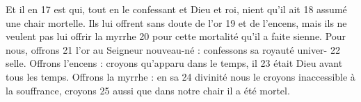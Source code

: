 Et il en	 
17	 	est qui, tout en le confessant et Dieu et roi, nient qu'il ait	 
18	 	assumé une chair mortelle. Ils lui offrent sans doute de l'or	 
19	 	et de l'encens, mais ils ne veulent pas lui offrir la myrrhe	 
20	 	pour cette mortalité qu'il a faite sienne. Pour nous, offrons	 
21	 	l'or au Seigneur nouveau-né : confessons sa royauté univer-	 
22	 	selle. Offrons l'encens : croyons qu'apparu dans le temps, il	 
23	 	était Dieu avant tous les temps. Offrons la myrrhe : en sa	 
24	 	divinité nous le croyons inaccessible à la souffrance, croyons	 
25	 	aussi que dans notre chair il a été mortel.